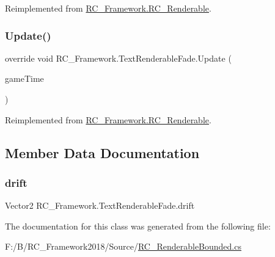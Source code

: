 Reimplemented from \mbox{\hyperlink{class_r_c___framework_1_1_r_c___renderable_ae65ce69704d15963789f421b58618b1f}{R\+C\+\_\+\+Framework.\+R\+C\+\_\+\+Renderable}}.

\mbox{\label{class_r_c___framework_1_1_text_renderable_fade_acbfdaa774ae0bc55e6c5593b765c9c38}} 
\subsubsection{\texorpdfstring{Update()}{Update()}}
{\footnotesize\ttfamily override void R\+C\+\_\+\+Framework.\+Text\+Renderable\+Fade.\+Update (\begin{DoxyParamCaption}\item[{Game\+Time}]{game\+Time }\end{DoxyParamCaption})\hspace{0.3cm}{\ttfamily [virtual]}}



Reimplemented from \mbox{\hyperlink{class_r_c___framework_1_1_r_c___renderable_a5745bedc7ba0587aa1e1d8563c357228}{R\+C\+\_\+\+Framework.\+R\+C\+\_\+\+Renderable}}.



\subsection{Member Data Documentation}
\mbox{\label{class_r_c___framework_1_1_text_renderable_fade_a887f3d6bb4b2dc61be19ae5e843ae478}} 
\subsubsection{\texorpdfstring{drift}{drift}}
{\footnotesize\ttfamily Vector2 R\+C\+\_\+\+Framework.\+Text\+Renderable\+Fade.\+drift}



The documentation for this class was generated from the following file\+:\begin{DoxyCompactItemize}
\item 
F\+:/\+B/\+R\+C\+\_\+\+Framework2018/\+Source/\mbox{\hyperlink{_r_c___renderable_bounded_8cs}{R\+C\+\_\+\+Renderable\+Bounded.\+cs}}\end{DoxyCompactItemize}
